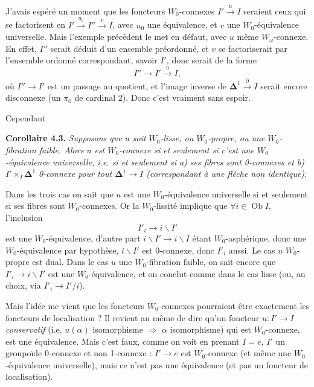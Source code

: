 \documentclass[11pt]{article}
\def\dcprintedpending{}
\newcommand{\msp}[1]{\marginpar{\footnotesize\raggedright
  \ifx\dcprintedpending\empty\else p.~\dcprintedpending\par\fi
  [#1]}\gdef\dcprintedpending{}}
\newcommand{\Ob}{\operatorname{Ob}}
\newcommand{\bDelta}{\boldsymbol{\Delta}}
\begin{document}
J'avais espéré un moment que les foncteurs $W_0$-connexes $I' \xrightarrow{u} I$ seraient ceux qui se factorisent en $I' \xrightarrow{u_0} I'' \xrightarrow{v} I$, avec $u_0$ une équivalence, et $v$ une $W_0$-équivalence universelle. Mais l'exemple précédent le met en défaut, avec $u$ même $W_\omega$-connexe. En effet, $I''$ serait déduit d'un ensemble préordonné, et $v$ se factoriserait par l'ensemble ordonné correspondant, savoir $I'$, donc serait de la forme
\[
I'' \longrightarrow I' \xrightarrow{u} I,
\]
où $I'' \longrightarrow I'$ est un passage au quotient, et l'image inverse de $\bDelta^1 \xrightarrow{\partial} I$ serait encore disconnexe (un $\pi_0$ de cardinal 2). Donc c'est vraiment sans espoir.

Cependant

\textbf{Corollaire 4.3.} \textit{Supposons que $u$ soit $W_0$-lisse, ou $W_0$-propre, ou une $W_0$-fibration faible. Alors $u$ est $W_0$-connexe si et seulement si c'est une $W_0$-équivalence universelle, i.e. si et seulement si a) ses fibres sont \textup{0}-connexes et b) $I' \times_I \bDelta^1$} \textit{\textup{0}-connexe pour tout $\bDelta^1 \longrightarrow I$ (correspondant à une flèche non identique).}

\msp{page 59}Dans les trois cas on sait que $u$ est une $W_0$-équivalence universelle si et seulement si ses fibres sont $W_0$-connexes. Or la $W_0$-lissité implique que $\forall i \in \Ob I$, l'inclusion
\[
I'_i \longrightarrow i\backslash I'
\]
est une $W_0$-équivalence, d'autre part $i\backslash I' \longrightarrow i\backslash I$ étant $W_0$-asphérique, donc une $W_0$-équivalence par hypothèse, $i\backslash I'$ est 0-connexe, donc $I'_i$ aussi. Le cas $u$ $W_0$-propre est dual. Dans le cas $u$ une $W_0$-fibration faible, on sait encore que $I'_i \longrightarrow i\backslash I'$ est une $W_0$-équivalence, et on conclut comme dans le cas lisse (ou, au choix, via $I'_i \longrightarrow I'/i$).

Mais l'idée me vient que les foncteurs $W_0$-connexes pourraient être exactement les foncteurs de localisation ? Il revient au même de dire qu'un foncteur $u : I' \longrightarrow I$ \textit{conservatif} (i.e. $u(\alpha)$ isomorphisme $\Longrightarrow$ $\alpha$ isomorphisme) qui est $W_0$-connexe, est une équivalence. Mais c'est faux, comme on voit en prenant $I = e$, $I'$ un groupoïde 0-connexe et non 1-connexe : $I' \longrightarrow e$ est $W_0$-connexe (et même une $W_0$-équivalence universelle), mais ce n'est pas une équivalence (et pas un foncteur de localisation).
\end{document}
